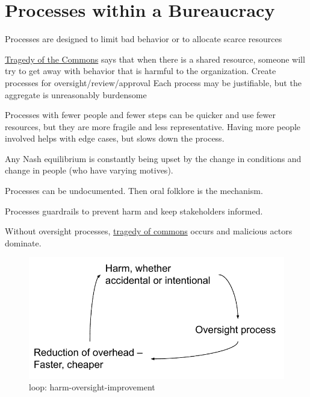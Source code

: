 \section{Processes within a Bureaucracy}

Processes are designed to limit bad behavior or to allocate scarce resources

\href{https://en.wikipedia.org/wiki/Tragedy_of_the_commons}{Tragedy of the Commons} says that when there is a shared resource, someone will try to get away with behavior that is harmful to the organization.
Create processes for oversight/review/approval
Each process may be justifiable, but the aggregate is unreasonably burdensome


Processes with fewer people and fewer steps can be quicker and use fewer resources, but they are more fragile and less representative. Having more people involved helps with edge cases, but slows down the process. 

Any Nash equilibrium is constantly being upset by the change in conditions and change in people (who have varying motives).


    Processes can be undocumented. Then oral folklore is the mechanism. 
    
    Processes guardrails to prevent harm and keep stakeholders informed. 
    
    Without oversight processes, \href{https://en.wikipedia.org/wiki/Tragedy_of_the_commons}{tragedy of commons} occurs and malicious actors dominate.
    


\begin{figure}
    \centering
    \includegraphics{images/process_loop_harm-oversight-improvement}
    \caption{loop: harm-oversight-improvement}
    \label{fig:harm-oversight-improvement}
\end{figure}


